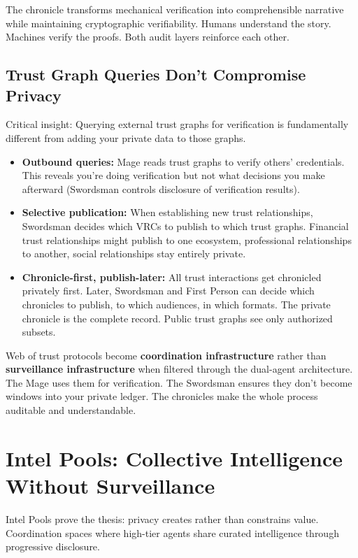 \documentclass[11pt,a4paper]{article}
\theoremstyle{definition}
\begin{document}
The chronicle transforms mechanical verification into comprehensible narrative while maintaining cryptographic verifiability. Humans understand the story. Machines verify the proofs. Both audit layers reinforce each other.

\subsection{Trust Graph Queries Don't Compromise Privacy}

Critical insight: Querying external trust graphs for verification is fundamentally different from adding your private data to those graphs.

\begin{itemize}
    \item \textbf{Outbound queries:} Mage reads trust graphs to verify others' credentials. This reveals you're doing verification but not what decisions you make afterward (Swordsman controls disclosure of verification results).
    \item \textbf{Selective publication:} When establishing new trust relationships, Swordsman decides which VRCs to publish to which trust graphs. Financial trust relationships might publish to one ecosystem, professional relationships to another, social relationships stay entirely private.
    \item \textbf{Chronicle-first, publish-later:} All trust interactions get chronicled privately first. Later, Swordsman and First Person can decide which chronicles to publish, to which audiences, in which formats. The private chronicle is the complete record. Public trust graphs see only authorized subsets.
\end{itemize}

Web of trust protocols become \textbf{coordination infrastructure} rather than \textbf{surveillance infrastructure} when filtered through the dual-agent architecture. The Mage uses them for verification. The Swordsman ensures they don't become windows into your private ledger. The chronicles make the whole process auditable and understandable.

\section{Intel Pools: Collective Intelligence Without Surveillance}

Intel Pools prove the thesis: privacy creates rather than constrains value. Coordination spaces where high-tier agents share curated intelligence through progressive disclosure.
\end{document}
